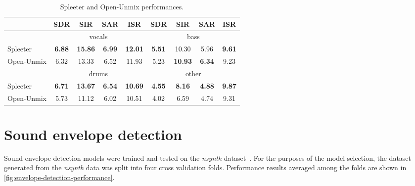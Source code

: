 \begin{table}[]
	\begin{center}
		\begin{tabular}{l|cccc|cccc}
			\hline
			& SDR & SIR & SAR & ISR & SDR & SIR & SAR & ISR           \\ \hline \hline
			& \multicolumn{4}{c|}{vocals}                                     & \multicolumn{4}{c}{bass}                                      \\ \hline
			Spleeter & \textbf{6.88} & \textbf{15.86} & \textbf{6.99} & \textbf{12.01} & \textbf{5.51} & 10.30 & 5.96 & \textbf{9.61} \\
			Open-Unmix & 6.32 & 13.33 & 6.52 & 11.93 & 5.23 & \textbf{10.93} & \textbf{6.34} & 9.23          \\ \hline \hline
			& \multicolumn{4}{c|}{drums}                                     & \multicolumn{4}{c}{other}                                      \\ \hline
			Spleeter & \textbf{6.71} & \textbf{13.67} & \textbf{6.54} & \textbf{10.69} & \textbf{4.55} & \textbf{8.16} & \textbf{4.88} & \textbf{9.87}  \\
			Open-Unmix & 5.73 & 11.12 & 6.02 & 10.51 & 4.02 & 6.59 & 4.74 & 9.31           \\ \hline
		\end{tabular}
		\caption{Spleeter and Open-Unmix performances.}
		\label{fig:spleeter-performance}
	\end{center}
\end{table}


\section{Sound envelope detection}\label{sec:sound-envelope-detection}

Sound envelope detection models were trained and tested on the \textit{nsynth} dataset~\cite{nsynth2017}. For
the purposes of the model selection, the dataset generated from the \textit{nsynth} data was split into four cross
validation folds. Performance results averaged among the folds are shown in \cref{fig:envelope-detection-performance}.

